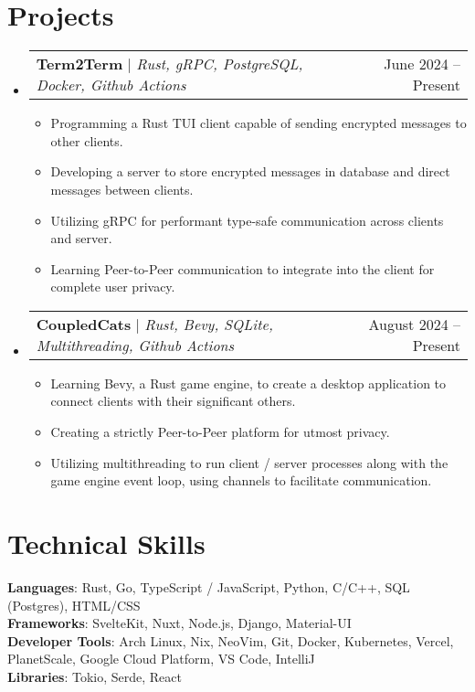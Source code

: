 \documentclass[letterpaper,11pt]{article}
\makeatletter
\newcommand{\resumeItem}[1]{
  \item\small{
    {#1 \vspace{-2pt}}
  }
}
\newcommand{\resumeProjectHeading}[2]{
    \item
    \begin{tabular*}{0.97\textwidth}{l@{\extracolsep{\fill}}r}
      \small#1 & #2 \\
    \end{tabular*}\vspace{-7pt}
}
\newcommand{\resumeSubHeadingListStart}{\begin{itemize}[leftmargin=0.15in, label={}]}
\newcommand{\resumeSubHeadingListEnd}{\end{itemize}}
\newcommand{\resumeItemListStart}{\begin{itemize}}
\newcommand{\resumeItemListEnd}{\end{itemize}\vspace{-5pt}}
\makeatother
\begin{document}
\section{Projects}
\resumeSubHeadingListStart
\resumeProjectHeading
{\textbf{Term2Term} $|$ \emph{Rust, gRPC, PostgreSQL, Docker, Github Actions}}{June 2024 -- Present}
\resumeItemListStart
\resumeItem{Programming a Rust TUI client capable of sending encrypted messages to other clients.}
\resumeItem{Developing a server to store encrypted messages in database and direct messages between clients.}
\resumeItem{Utilizing gRPC for performant type-safe communication across clients and server.}
\resumeItem{Learning Peer-to-Peer communication to integrate into the client for complete user privacy.}
\resumeItemListEnd
\resumeProjectHeading
{\textbf{CoupledCats} $|$ \emph{Rust, Bevy, SQLite, Multithreading, Github Actions}}{August 2024 -- Present}
\resumeItemListStart
\resumeItem{Learning Bevy, a Rust game engine, to create a desktop application to connect clients with their significant others.}
\resumeItem{Creating a strictly Peer-to-Peer platform for utmost privacy.}
\resumeItem{Utilizing multithreading to run client / server processes along with the game engine event loop, using channels to facilitate communication.}
\resumeItemListEnd
\resumeSubHeadingListEnd



%
\section{Technical Skills}
\begin{itemize}[leftmargin=0.15in, label={}]
	\small{\item{
	      \textbf{Languages}{: Rust, Go, TypeScript / JavaScript, Python, C/C++, SQL (Postgres), HTML/CSS} \\
	      \textbf{Frameworks}{: SvelteKit, Nuxt, Node.js, Django, Material-UI} \\
	      \textbf{Developer Tools}{: Arch Linux, Nix, NeoVim, Git, Docker, Kubernetes, Vercel, PlanetScale, Google Cloud Platform, VS Code, IntelliJ} \\
	      \textbf{Libraries}{: Tokio, Serde, React}
	      }}
\end{itemize}


\end{document}
